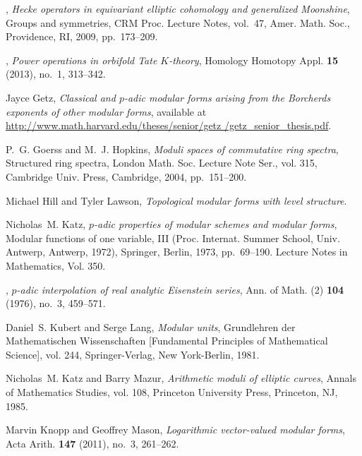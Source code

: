 \documentclass{gtpart}
\theoremstyle{definition}
\theoremstyle{remark}
\renewcommand{\=}{\approx}
\renewcommand{\-}{\sim}
\numberwithin{equation}{section}
\numberwithin{thm}{section}
\begin{document}
\begin{thebibliography}
\bysame, \emph{Hecke operators in equivariant elliptic cohomology and
  generalized {M}oonshine}, Groups and symmetries, CRM Proc. Lecture Notes,
  vol.~47, Amer. Math. Soc., Providence, RI, 2009, pp.~173--209. 

\bysame, \emph{Power operations in orbifold {T}ate {$K$}-theory}, Homology
  Homotopy Appl. \textbf{15} (2013), no.~1, 313--342. 

Jayce Getz, \emph{Classical and {$p$}-adic modular forms arising from the
  {B}orcherds exponents of other modular forms}, 
  available at 
  \href{http://www.math.harvard.edu/theses/senior/getz/getz_senior_thesis.pdf}
  {http://www.math.harvard.edu/theses/senior/getz\linebreak
  /getz\_senior\_thesis.pdf}.

P.~G. Goerss and M.~J. Hopkins, \emph{Moduli spaces of commutative ring
  spectra}, Structured ring spectra, London Math. Soc. Lecture Note Ser., vol.
  315, Cambridge Univ. Press, Cambridge, 2004, pp.~151--200. 

Michael Hill and Tyler Lawson, \emph{Topological modular forms with level
  structure}. 

Nicholas~M. Katz, \emph{{$p$}-adic properties of modular schemes and modular
  forms}, Modular functions of one variable, {III} ({P}roc. {I}nternat.
  {S}ummer {S}chool, {U}niv. {A}ntwerp, {A}ntwerp, 1972), Springer, Berlin,
  1973, pp.~69--190. Lecture Notes in Mathematics, Vol. 350. 

\bysame, \emph{{$p$}-adic interpolation of real analytic {E}isenstein series},
  Ann. of Math. (2) \textbf{104} (1976), no.~3, 459--571. 

Daniel~S. Kubert and Serge Lang, \emph{Modular units}, Grundlehren der
  Mathematischen Wissenschaften [Fundamental Principles of Mathematical
  Science], vol. 244, Springer-Verlag, New York-Berlin, 1981. 

Nicholas~M. Katz and Barry Mazur, \emph{Arithmetic moduli of elliptic curves},
  Annals of Mathematics Studies, vol. 108, Princeton University Press,
  Princeton, NJ, 1985. 

Marvin Knopp and Geoffrey Mason, \emph{Logarithmic vector-valued modular
  forms}, Acta Arith. \textbf{147} (2011), no.~3, 261--262. 


\end{thebibliography}
\end{document}
